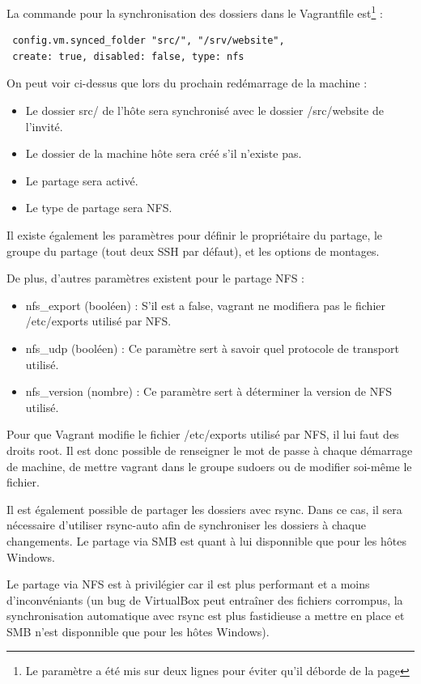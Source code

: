 \documentclass[12pt,a4paper]{article}
\begin{document}
La commande pour la synchronisation des dossiers dans le Vagrantfile est\footnote{Le paramètre a été mis sur deux lignes pour éviter qu'il déborde de la page} :
\begin{lstlisting}
 config.vm.synced_folder "src/", "/srv/website", 
 create: true, disabled: false, type: nfs
\end{lstlisting}
On peut voir ci-dessus que lors du prochain redémarrage de la machine :
\begin{itemize}
	\item{Le dossier src/ de l'hôte sera synchronisé avec le dossier /src/website de l'invité.}
	\item{Le dossier de la machine hôte sera créé s'il n'existe pas.}
	\item{Le partage sera activé.}
	\item{Le type de partage sera NFS.}
\end{itemize}
Il existe également les paramètres pour définir le propriétaire du partage, le groupe du partage (tout deux SSH par défaut), et les options de montages.

De plus, d'autres paramètres existent pour le partage NFS : 
\begin{itemize}
	\item{nfs\_export (booléen) : S'il est a false, vagrant ne modifiera pas le fichier /etc/exports utilisé par NFS.}
	\item{nfs\_udp (booléen) : Ce paramètre sert à savoir quel protocole de transport utilisé.}
	\item{nfs\_version (nombre) : Ce paramètre sert à déterminer la version de NFS utilisé.}
\end{itemize}
Pour que Vagrant modifie le fichier /etc/exports utilisé par NFS, il lui faut des droits root. Il est donc possible de renseigner le mot de passe à chaque démarrage de machine, de mettre vagrant dans le groupe sudoers ou de modifier soi-même le fichier.

Il est également possible de partager les dossiers avec rsync. Dans ce cas, il sera nécessaire d'utiliser rsync-auto afin de synchroniser les dossiers à chaque changements. Le partage via SMB est quant à lui disponnible que pour les hôtes Windows. 

Le partage via NFS est à privilégier car il est plus performant et a moins d'inconvéniants (un bug de VirtualBox peut entraîner des fichiers corrompus, la synchronisation automatique avec rsync est plus fastidieuse a mettre en place et SMB n'est disponnible que pour les hôtes Windows).
\end{document}
